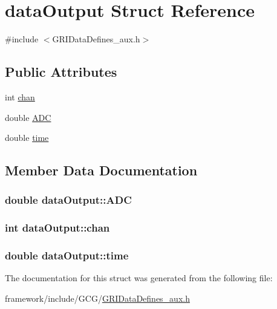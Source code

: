 \hypertarget{structdataOutput}{\section{data\-Output \-Struct \-Reference}
\label{structdataOutput}
}


{\ttfamily \#include $<$\-G\-R\-I\-Data\-Defines\-\_\-aux.\-h$>$}

\subsection*{\-Public \-Attributes}
\begin{DoxyCompactItemize}
\item 
int \hyperlink{structdataOutput_ac45192328e3a8a72e0e8237db7160abd}{chan}
\item 
double \hyperlink{structdataOutput_a1179271baba459362ac3eb3f5679fb93}{\-A\-D\-C}
\item 
double \hyperlink{structdataOutput_a7d58feeed1ee96d2300023da35879902}{time}
\end{DoxyCompactItemize}


\subsection{\-Member \-Data \-Documentation}
\hypertarget{structdataOutput_a1179271baba459362ac3eb3f5679fb93}{
\subsubsection[{\-A\-D\-C}]{\setlength{\rightskip}{0pt plus 5cm}double {\bf data\-Output\-::\-A\-D\-C}}}\label{structdataOutput_a1179271baba459362ac3eb3f5679fb93}
\hypertarget{structdataOutput_ac45192328e3a8a72e0e8237db7160abd}{
\subsubsection[{chan}]{\setlength{\rightskip}{0pt plus 5cm}int {\bf data\-Output\-::chan}}}\label{structdataOutput_ac45192328e3a8a72e0e8237db7160abd}
\hypertarget{structdataOutput_a7d58feeed1ee96d2300023da35879902}{
\subsubsection[{time}]{\setlength{\rightskip}{0pt plus 5cm}double {\bf data\-Output\-::time}}}\label{structdataOutput_a7d58feeed1ee96d2300023da35879902}


\-The documentation for this struct was generated from the following file\-:\begin{DoxyCompactItemize}
\item 
framework/include/\-G\-C\-G/\hyperlink{GRIDataDefines__aux_8h}{\-G\-R\-I\-Data\-Defines\-\_\-aux.\-h}\end{DoxyCompactItemize}
